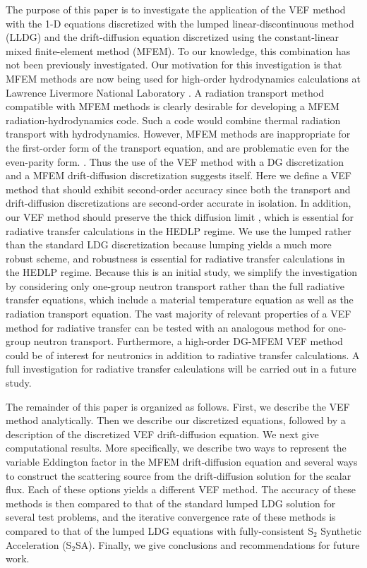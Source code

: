 The purpose of this paper is to investigate the application of the VEF method with the 1-D \SN equations 
discretized with the lumped linear-discontinuous method (LLDG) and the drift-diffusion equation discretized using the 
constant-linear mixed finite-element method (MFEM).  To our knowledge, this combination has not been previously 
investigated.  Our motivation for this investigation is that MFEM methods are now being used for high-order hydrodynamics 
calculations at Lawrence Livermore National Laboratory \cite{*}.  A radiation transport method compatible with MFEM 
methods is clearly desirable for developing a MFEM radiation-hydrodynamics code.  Such a code would combine thermal 
radiation transport with hydrodynamics.  However, MFEM methods are inappropriate for the first-order form of the 
transport equation, and are problematic even for the even-parity form. \cite{*}.  
Thus the use of the VEF method with a DG \SN discretization and a MFEM drift-diffusion discretization suggests itself.
Here we define a VEF method that should exhibit second-order accuracy since both the transport and drift-diffusion 
discretizations are second-order accurate in isolation.  In addition, our VEF method should preserve the thick diffusion 
limit \cite{*}, which is essential for radiative transfer calculations in the HEDLP regime. We use the lumped 
rather than the standard LDG discretization because lumping yields a much more robust scheme, and robustness is essential 
for radiative transfer calculations in the HEDLP regime.   Because this is an initial study, we simplify the investigation by considering 
only one-group neutron transport rather than the full radiative transfer equations, which include a 
material temperature equation as well as the radiation transport equation.  The vast majority of relevant properties of  
a VEF method for radiative transfer can be tested with an analogous method for one-group neutron transport.  Furthermore, 
a high-order DG-MFEM VEF method could be of interest for neutronics in addition to radiative transfer calculations. 
A full investigation for radiative transfer calculations will be carried out in a future study. 

The remainder of this paper is organized as follows.  First, we describe the VEF method analytically. Then we describe 
our discretized \SN equations, followed by a description of the discretized VEF drift-diffusion equation.  We next give 
computational results.  More specifically, we describe 
two ways to represent the \SN variable Eddington factor in the MFEM drift-diffusion equation and several ways to 
construct the \SN scattering source from the drift-diffusion solution for the scalar flux. Each of these options 
yields a different VEF method.  The accuracy of these methods is then compared to that of the standard lumped LDG 
\SN solution for several test problems, and the iterative convergence rate of these methods is compared to that of the 
lumped LDG \SN equations with fully-consistent S$_2$ Synthetic Acceleration (S$_2$SA). Finally, we give conclusions and 
recommendations for future work.